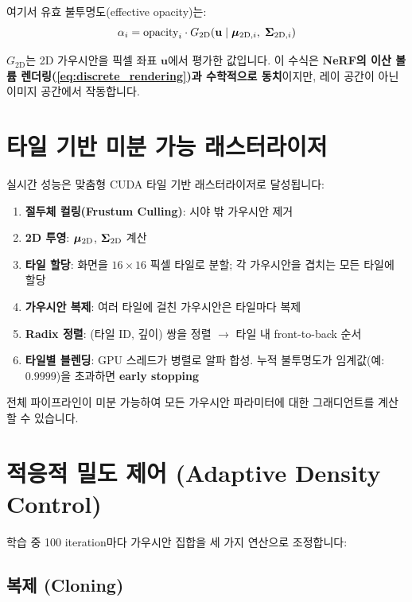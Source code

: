 \documentclass[11pt, a4paper]{report}
\begin{document}
여기서 유효 불투명도(effective opacity)는:
\begin{equation}
\alpha_i = \text{opacity}_i \cdot G_{\text{2D}}(\mathbf{u} \mid \bm{\mu}_{\text{2D},i},\; \bm{\Sigma}_{\text{2D},i})
\label{eq:effective_opacity}
\end{equation}

$G_{\text{2D}}$는 2D 가우시안을 픽셀 좌표 $\mathbf{u}$에서 평가한 값입니다. 이 수식은 \textbf{NeRF의 이산 볼륨 렌더링(\cref{eq:discrete_rendering})과 수학적으로 동치}이지만, 레이 공간이 아닌 이미지 공간에서 작동합니다.


\section{타일 기반 미분 가능 래스터라이저}
\label{sec:rasterizer}

실시간 성능은 맞춤형 CUDA 타일 기반 래스터라이저로 달성됩니다:

\begin{enumerate}[leftmargin=*]
  \item \textbf{절두체 컬링(Frustum Culling)}: 시야 밖 가우시안 제거
  \item \textbf{2D 투영}: $\bm{\mu}_{\text{2D}}$, $\bm{\Sigma}_{\text{2D}}$ 계산
  \item \textbf{타일 할당}: 화면을 $16 \times 16$ 픽셀 타일로 분할; 각 가우시안을 겹치는 모든 타일에 할당
  \item \textbf{가우시안 복제}: 여러 타일에 걸친 가우시안은 타일마다 복제
  \item \textbf{Radix 정렬}: (타일 ID, 깊이) 쌍을 정렬 $\rightarrow$ 타일 내 front-to-back 순서
  \item \textbf{타일별 블렌딩}: GPU 스레드가 병렬로 알파 합성. 누적 불투명도가 임계값(예: $0.9999$)을 초과하면 \textbf{early stopping}
\end{enumerate}

전체 파이프라인이 미분 가능하여 모든 가우시안 파라미터에 대한 그래디언트를 계산할 수 있습니다.


\section{적응적 밀도 제어 (Adaptive Density Control)}
\label{sec:density_control}

학습 중 100 iteration마다 가우시안 집합을 세 가지 연산으로 조정합니다:

\subsection{복제 (Cloning)}
\end{document}
